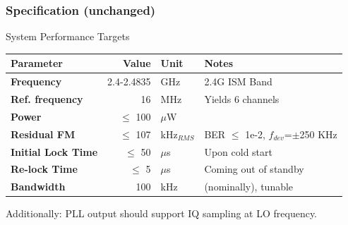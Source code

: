 \documentclass[t, screen, aspectratio=43]{beamer}
\begin{document}


\begin{frame}
	\frametitle{Specification (unchanged)}
	\begin{block}{System Performance Targets}
		\scriptsize
		\begin{table}[h!]
			\centering
			\def\arraystretch{1.5}		
			\setlength\arrayrulewidth{0.75pt}
			\setlength{\tabcolsep}{1em} %
			\begin{tabular}{|l|r|l|l|}
				\hline 
				\rule[-1ex]{0pt}{2.5ex} \cellcolor{gray!40}\textbf{Parameter} & \cellcolor{gray!40}\textbf{Value} & \cellcolor{gray!40}\textbf{Unit }& \cellcolor{gray!40}\textbf{Notes}\\ 
				\hline 
				\rule[-1ex]{0pt}{2.5ex} \textbf{Frequency}  & 2.4-2.4835 & GHz & 2.4G ISM Band\\ 
				\hline 
				\rule[-1ex]{0pt}{2.5ex} \textbf{Ref. frequency} & 16 & MHz & Yields 6 channels \\ 
				\hline 
				\rule[-1ex]{0pt}{2.5ex} \textbf{Power} & $\leq$ 100  &$\mu$W & \\ 
				\hline 
				\rule[-1ex]{0pt}{2.5ex} \textbf{Residual FM} & $\leq$ 107  &kHz$_{RMS}$ & BER $\leq$ 1e-2, $f_{dev}$=$\pm$250 KHz\\ 
				\hline 
				\rule[-1ex]{0pt}{2.5ex} \textbf{Initial Lock Time} & $\leq$ 50 & $\mu$s & Upon cold start \\ 
				\hline 
				\rule[-1ex]{0pt}{2.5ex} \textbf{Re-lock Time} & $\leq$ 5 & $\mu$s & Coming out of standby \\ 
				\hline 
				\rule[-1ex]{0pt}{2.5ex} \textbf{Bandwidth} & 100 & kHz & (nominally), tunable \\ 
				\hline 
			\end{tabular} 
		\end{table}   
		Additionally: PLL output should support IQ sampling at LO frequency.
	\end{block}    
\end{frame}
\end{document}
